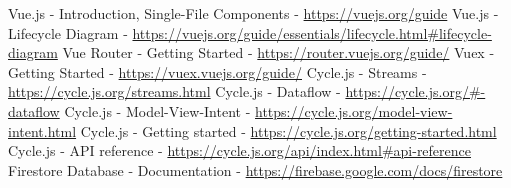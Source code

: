\documentclass[shortabstract]{iithesis}
\theoremstyle{definition} \newtheorem{definition}{Definicja}[]
\theoremstyle{remark} \newtheorem{remark}[definition]{Observation}
\theoremstyle{plain} \newtheorem{theorem}[definition]{Theorem}
\theoremstyle{plain} \newtheorem{lemma}[definition]{Lemma}
\begin{document}
\begin{thebibliography}{1}
     Vue.js - Introduction, Single-File Components - \url{https://vuejs.org/guide}
     Vue.js - Lifecycle Diagram - \url{https://vuejs.org/guide/essentials/lifecycle.html#lifecycle-diagram}
     Vue Router - Getting Started - \url{https://router.vuejs.org/guide/}
     Vuex - Getting Started - \url{https://vuex.vuejs.org/guide/}
     Cycle.js - Streams - \url{https://cycle.js.org/streams.html}
     Cycle.js - Dataflow - \url{https://cycle.js.org/#-dataflow}
     Cycle.js - Model-View-Intent - \url{https://cycle.js.org/model-view-intent.html}
     Cycle.js - Getting started - \url{https://cycle.js.org/getting-started.html}
     Cycle.js - API reference - \url{https://cycle.js.org/api/index.html#api-reference}
     Firestore Database - Documentation - \url{https://firebase.google.com/docs/firestore}
\end{thebibliography}
\end{document}

